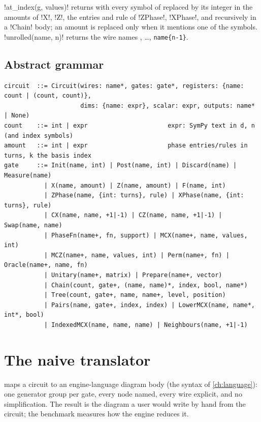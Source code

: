 \py!at_index(g, values)! returns  with every symbol of  replaced by its
integer in the amounts of \py!X!, \py!Z!, the entries and rule of \py!ZPhase!, \py!XPhase!,
and recursively in a \py!Chain! body; an amount is replaced only when it mentions one of the
symbols. \py!unrolled(name, n)! returns the wire names , \dots,
\texttt{name\{n-1\}}.

\subsection{Abstract grammar}

\begin{lstlisting}[style=grammar,caption={Abstract grammar of the circuit IR.}]
circuit  ::= Circuit(wires: name*, gates: gate*, registers: {name: count | (count, count)},
                     dims: {name: expr}, scalar: expr, outputs: name* | None)
count    ::= int | expr                      expr: SymPy text in d, n (and index symbols)
amount   ::= int | expr                      phase entries/rules in turns, k the basis index
gate     ::= Init(name, int) | Post(name, int) | Discard(name) | Measure(name)
           | X(name, amount) | Z(name, amount) | F(name, int)
           | ZPhase(name, {int: turns}, rule) | XPhase(name, {int: turns}, rule)
           | CX(name, name, +1|-1) | CZ(name, name, +1|-1) | Swap(name, name)
           | PhaseFn(name+, fn, support) | MCX(name+, name, values, int)
           | MCZ(name+, name, values, int) | Perm(name+, fn) | Oracle(name+, name, fn)
           | Unitary(name+, matrix) | Prepare(name+, vector)
           | Chain(count, gate+, (name, name)*, index, bool, name*)
           | Tree(count, gate+, name, name+, level, position)
           | Pairs(name, gate+, index, index) | LowerMCX(name, name*, int*, bool)
           | IndexedMCX(name, name, name) | Neighbours(name, +1|-1)
\end{lstlisting}

\section{The naive translator}\label{sec:bench-translate}

 maps a circuit to an engine-language diagram body (the syntax of
\cref{ch:language}): one generator group per gate, every node named, every wire explicit, and
no simplification. The result is the diagram a user would write by hand from the circuit; the
benchmark measures how the engine reduces it.

